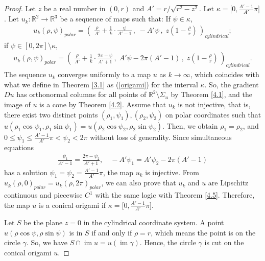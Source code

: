 \documentclass{amsart}
\theoremstyle{plain}
\theoremstyle{definition}
\theoremstyle{remark}
\DeclareMathOperator{\im}{im}
\begin{document}
\begin{proof}
Let $z$ be a real number in $(0,r)$ and $A'=r/\sqrt{r^2-z^2}$.
Let $\kappa=\bigl[0,\frac{A'-1}{A'}\pi\bigr]$.
Let $u_k:\mathbb{R}^2\to\mathbb{R}^3$ be a sequence of maps such that: If $\psi\in\kappa$,
\begin{align*}
u_k(\rho,\psi)_{polar}=\left(\;\frac{\rho}{A'}+\frac1k\cdot\frac{\psi}{A'-1}\,,\;-A'\psi\,,\;z\left(1-\frac{\rho}{r}\right)\,\right)_{cylindrical};
\end{align*}
if $\psi\in[0,2\pi]\setminus\kappa$,
\begin{align*}
u_k(\rho,\psi)_{polar}=\left(\;\frac{\rho}{A'}+\frac1k\cdot\frac{2\pi-\psi}{A'+1}\,,\;A'\psi-2\pi(A'-1)\,,\;z\left(1-\frac{\rho}{r}\right)\,\right)_{cylindrical}.
\end{align*}
The sequence $u_k$ converges uniformly to a map $u$ as $k\to\infty$, which coincides with what we define in Theorem \ref{3.1} as (\ref{origami}) for the interval $\kappa$.
So, the gradient $Du$ has orthonormal columns for all points of $\mathbb{R}^2\setminus\Sigma_u$ by Theorem \ref{4.1}, and the image of $u$ is a cone by Theorem \ref{4.2}.
Assume that $u_k$ is not injective, that is, there exist two distinct points $(\rho_1,\psi_1),(\rho_2,\psi_2)$ on polar coordinates such that $u(\rho_1\cos\psi_1,\rho_1\sin\psi_1)=u(\rho_2\cos\psi_2,\rho_2\sin\psi_2)$.
Then, we obtain $\rho_1=\rho_2$, and $0\le\psi_1\le\frac{A'-1}{A'}\pi<\psi_2<2\pi$ without loss of generality.
Since simultaneous equations
\begin{align*}
\frac{\psi_1}{A'-1}=\frac{2\pi-\psi_2}{A'+1},\quad-A'\psi_1=A'\psi_2-2\pi(A'-1)
\end{align*}
has a solution $\psi_1=\psi_2=\frac{A'-1}{A'}\pi$, the map $u_k$ is injective.
From $u_k(\rho,0)_{polar}=u_k(\rho,2\pi)_{polar}$, we can also prove that $u_k$ and $u$ are Lipschitz continuous and piecewise $C^1$ with the same logic with Theorem \ref{4.5}.
Therefore, the map $u$ is a conical origami if $\kappa=\bigl[0,\frac{A'-1}{A'}\pi\bigr]$.

Let $S$ be the plane $z=0$ in the cylindrical coordinate system.
A point $u(\rho\cos\psi,\rho\sin\psi)$ is in $S$ if and only if $\rho=r$, which means the point is on the circle $\gamma$.
So, we have $S\cap\im u=u(\im\gamma)$.
Hence, the circle $\gamma$ is cut on the conical origami $u$.
\end{proof}
\end{document}
